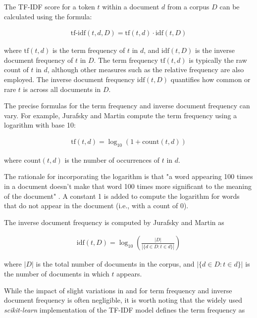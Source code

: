 The TF-IDF score for a token $t$ within a document $d$ from a corpus $D$ can be calculated using the formula:

\begin{align}
    \text{tf-idf}(t, d, D) = \text{tf}(t, d) \cdot \text{idf}(t, D) \label{eq:tf-idf}
\end{align}

where $\text{tf}(t, d)$ is the term frequency of $t$ in $d$, and $\text{idf}(t, D)$ is the inverse document frequency of $t$ in $D$. The term frequency $\text{tf}(t, d)$ is typically the raw count of $t$ in $d$, although other measures such as the relative frequency are also employed. The inverse document frequency $\text{idf}(t, D)$ quantifies how common or rare $t$ is across all documents in $D$.

The precise formulas for the term frequency and inverse document frequency can vary. For example, Jurafsky and Martin \cite{JurafskySpeechLanguage2022} compute the term frequency using a logarithm with base 10:

\begin{align}
    \text{tf}(t, d) = \log_{10} \left( 1 + \text{count}(t, d) \right) \label{eq:tf}
\end{align}

where $\text{count}(t, d)$ is the number of occurrences of $t$ in $d$.

The rationale for incorporating the logarithm is that "a word appearing 100 times in a document doesn’t make that word 100 times more significant to the meaning of the document" \cite{JurafskySpeechLanguage2022}. A constant 1 is added to compute the logarithm for words that do not appear in the document (i.e., with a count of 0).

The inverse document frequency is computed by Jurafsky and Martin as

\begin{align}
    \text{idf}(t, D) = \log_{10} \left( \frac{|D|}{|\{d \in D : t \in d\}|} \right) \label{eq:idf}
\end{align}

where $|D|$ is the total number of documents in the corpus, and $|\{d \in D : t \in d\}|$ is the number of documents in which $t$ appears.

While the impact of slight variations in  and  for term frequency and inverse document frequency is often negligible, it is worth noting that the widely used \emph{scikit-learn} \cite{PedregosaScikitlearnMachine2011} implementation of the TF-IDF model defines the term frequency as

